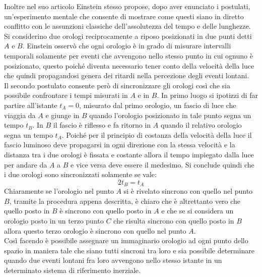 Inoltre nel suo articolo Einstein stesso propose, dopo aver enunciato i postulati, un'esperimento mentale che consente di mostrare come questi siano in diretto conflitto con le assunzioni classiche dell'assolutezza del tempo e delle lunghezze. Si considerino due orologi reciprocamente a riposo posizionati in due punti detti $A$ e $B$. Einstein osservò che ogni orologio è in grado di misurare intervalli temporali solamente per eventi che avvengono nello stesso punto in cui ognuno è posizionato, questo poiché diventa necessario tener conto della velocità della luce che quindi propagandosi genera dei ritardi nella percezione degli eventi lontani.\\ Il secondo postulato consente però di sincronizzare gli orologi così che sia possibile confrontare i tempi misurati in $A$ e in $B$. In primo luogo si ipotizzi di far partire all'istante $t_A=0$, misurato dal primo orologio, un fascio di luce che viaggia da $A$ e giunge in $B$ quando l'orologio posizionato in tale punto segna un tempo $t_B$. In $B$ il fascio è riflesso e fa ritorno in $A$ quando il relativo orologio segna un tempo $t_A$. Poiché per il principio di costanza della velocità della luce il fascio luminoso deve propagarsi in ogni direzione con la stessa velocità e la distanza tra i due orologi è fissata e costante allora il tempo impiegato dalla luce per andare da $A$ a $B$ e vice versa deve essere il medesimo. Si conclude quindi che i due orologi sono sincronizzati solamente se vale:
\begin{equation}
    2t_B=t_A
    \label{SinconizazioneOrologi}
\end{equation}
Chiaramente se l'orologio nel punto $A$ si è rivelato sincrono con quello nel punto $B$, tramite la procedura appena descritta, è chiaro che è altrettanto vero che quello posto in $B$ è sincrono con quello posto in $A$ e che se si considera un orologio posto in un terzo punto $C$ che risulta sincrono con quello posto in $B$ allora questo terzo orologio è sincrono con quello nel punto $A$.\\Così facendo è possibile assegnare un immaginario orologio ad ogni punto dello spazio in maniera tale che siano tutti sincroni tra loro e sia possibile determinare quando due eventi lontani fra loro avvengono nello stesso istante in un determinato sistema di riferimento inerziale.\\
